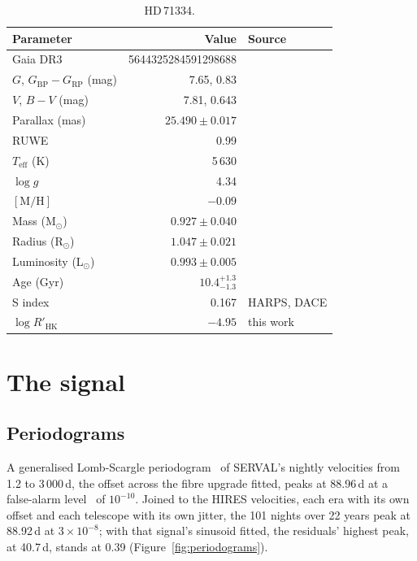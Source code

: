 \documentclass[3p,11pt]{elsarticle}
\newcommand{\Msun}{M$_\odot$}
\newcommand{\Rsun}{R$_\odot$}
\newcommand{\Lsun}{L$_\odot$}
\begin{document}
\begin{table}[!htbp]
\centering
\caption{HD\,71334.}\label{tab:star}
\begin{tabular}{l r l}
\toprule
Parameter & Value & Source \\
\midrule
Gaia DR3 & 5644325284591298688 & \cite{GaiaDR3} \\
$G$, $G_\mathrm{BP} - G_\mathrm{RP}$ (mag) & 7.65, 0.83 & \cite{GaiaDR3} \\
$V$, $B-V$ (mag) & 7.81, 0.643 & \cite{Perryman1997} \\
Parallax (mas) & $25.490 \pm 0.017$ & \cite{GaiaDR3} \\
RUWE & 0.99 & \cite{GaiaDR3} \\
$T_\mathrm{eff}$ (K) & 5\,630 & \cite{Creevey2023} \\
$\log g$ & 4.34 & \cite{Creevey2023} \\
$[\mathrm{M/H}]$ & $-0.09$ & \cite{Creevey2023} \\
Mass (\Msun) & $0.927 \pm 0.040$ & \cite{Creevey2023} \\
Radius (\Rsun) & $1.047 \pm 0.021$ & \cite{Creevey2023} \\
Luminosity (\Lsun) & $0.993 \pm 0.005$ & \cite{Creevey2023} \\
Age (Gyr) & $10.4^{+1.3}_{-1.3}$ & \cite{Creevey2023} \\
S index & 0.167 & HARPS, DACE \\
$\log R'_\mathrm{HK}$ & $-4.95$ & this work \\
\bottomrule
\end{tabular}
\end{table}

\section{The signal}\label{sec:signal}

\subsection{Periodograms}

A generalised Lomb-Scargle periodogram~\cite{Zechmeister2009} of SERVAL's nightly velocities from 1.2 to
3\,000\,d, the offset across the fibre upgrade fitted, peaks at 88.96\,d at a false-alarm
level~\cite{Baluev2008} of $10^{-10}$. Joined to the HIRES velocities, each era with its own offset and
each telescope with its own jitter, the 101 nights over 22 years peak at 88.92\,d at
$3\times10^{-8}$; with that signal's sinusoid fitted, the residuals' highest peak, at 40.7\,d, stands at
0.39 (Figure~\ref{fig:periodograms}).
\end{document}
